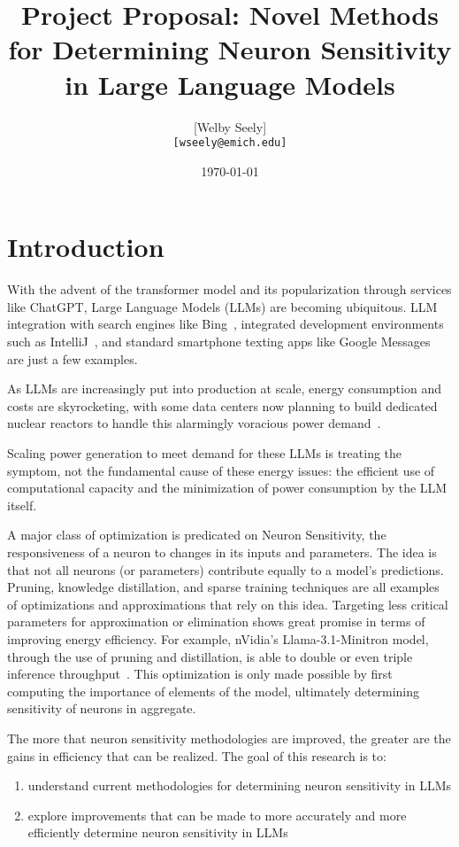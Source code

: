 \documentclass{article}
\title{Project Proposal: Novel Methods for Determining Neuron Sensitivity in Large Language Models}
\author{
  [Welby Seely] \\
  \texttt{[wseely@emich.edu]}
}
\date{\today}
\begin{document}
\maketitle

\section*{Introduction}
With the advent of the transformer model and its popularization through services like ChatGPT, Large Language Models (LLMs) are becoming ubiquitous.
LLM integration with search engines like Bing~\cite{APNews2024Microsoft}, integrated development environments such as IntelliJ~\cite{anderson_jetbrains_2023}, and standard smartphone texting apps like Google Messages~\cite{msn_gemini_2024} are just a few examples.

As LLMs are increasingly put into production at scale, energy consumption and costs are skyrocketing, with some data centers now planning to build dedicated nuclear reactors to handle this alarmingly voracious power demand~\cite{CNBC2024Oracle}.

Scaling power generation to meet demand for these LLMs is treating the symptom, not the fundamental cause of these energy issues: the efficient use of computational capacity and the minimization of power consumption by the LLM itself.

A major class of optimization is predicated on Neuron Sensitivity, the responsiveness of a neuron to changes in its inputs and parameters.
The idea is that not all neurons (or parameters) contribute equally to a model's predictions.
Pruning, knowledge distillation, and sparse training techniques are all examples of optimizations and approximations that rely on this idea.
Targeting less critical parameters for approximation or elimination shows great promise in terms of improving energy efficiency.
For example, nVidia's Llama-3.1-Minitron model, through the use of pruning and distillation, is able to double or even triple inference throughput~\cite{sreenivas2024llm}.
This optimization is only made possible by first computing the importance of elements of the model, ultimately determining sensitivity of neurons in aggregate.

The more that neuron sensitivity methodologies are improved, the greater are the gains in efficiency that can be realized.
The goal of this research is to:
\begin{enumerate}
    \item understand current methodologies for determining neuron sensitivity in LLMs
    \item explore improvements that can be made to more accurately and more efficiently determine neuron sensitivity in LLMs
\end{enumerate}
\end{document}
